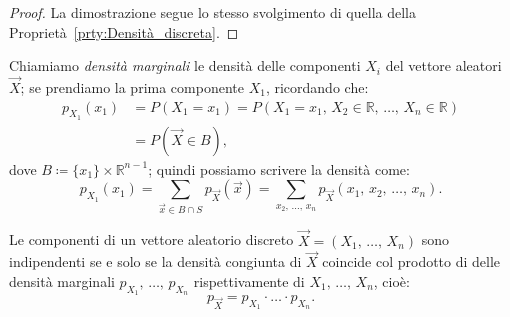         \begin{proof}
            La dimostrazione segue lo stesso svolgimento di quella della Proprietà~\ref{prty:Densità_discreta}.
        \end{proof}
        \begin{defn}\label{defn:Densità_marginali}
            Chiamiamo \emph{densità marginali} le densità delle componenti $X_i$ del vettore aleatori $\vec{X}$; se prendiamo la prima componente $X_1$, ricordando che:
            \begin{align*}
                p_{X_1}(x_1) &= P(X_1 = x_1) = P(X_1 = x_1,\, X_2 \in \mathbb{R},\, \ldots,\, X_n \in \mathbb{R}) \\
                             &= P(\vec{X} \in B)
            ,\end{align*}
            dove $B \coloneqq \{x_1\} \times \mathbb{R}^{n-1}$; quindi possiamo scrivere la densità come:
            \begin{equation}\label{eq:Densità_marginali}
                p_{X_1}(x_1) = \!\! \sum_{\vec{x} \in B \cap S} \!\! p_{\vec{X}}(\vec{x}) 
                = \!\! \sum_{x_2,\, \ldots,\, x_{n}} \!\! p_{\vec{X}}(x_1,\, x_2,\, \ldots,\, x_{n})
            .\end{equation}
        \end{defn}
        \begin{prty}\label{prty:Indipendenza_componenti_densità}
            Le componenti di un vettore aleatorio discreto $\vec{X} = (X_1,\, \ldots,\, X_{n})$ sono indipendenti se e solo se la densità congiunta di $\vec{X}$ coincide col prodotto di delle densità marginali $p_{X_1},\, \ldots,\, p_{X_n}$ rispettivamente di $X_1,\, \ldots,\, X_{n}$, cioè: \[
            p_{\vec{X}} = p_{X_1} \cdot \ldots \cdot p_{X_n}
            .\]
        \end{prty}
